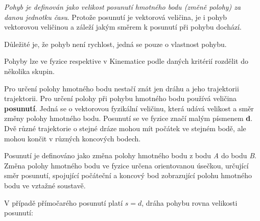 {\it Pohyb je definován jako velikost posunutí hmotného bodu (změně polohy) za danou jednotku času}. Protože posunutí je vektorová veličina, je i pohyb vektorovou veličinou a záleží jakým směrem k posunutí při pohybu dochází.

Důležité je, že pohyb není rychlost, jedná se pouze o vlastnost pohybu. 


Pohyby lze ve fyzice respektive v Kinematice podle daných kritérií rozdělit do několika skupin.
\vskip 4mm
\vskip 4mm

\vskip 4mm

\vskip 4mm


Pro určení polohy hmotného bodu nestačí znát jen dráhu a jeho trajektorii trajektorii. Pro určení polohy při pohybu hmotného bodu používá veličina {\bf posunutí}. Jedná se o vektorovou fyzikální veličinu, která udává velikost a směr změny polohy hmotného bodu. Posunutí se ve fyzice značí malým písmenem {\bf d}. Dvě různé trajektorie o stejné dráze mohou mít počátek ve stejném bodě, ale mohou končit v různých koncových bodech. 

\centerline{}

Posunutí je definováno jako změna polohy hmotného bodu z bodu {\it A} do bodu {\it B}. Změna polohy hmotného bodu ve fyzice určena orientovanou úsečkou, určující směr posunutí, spojující počáteční a koncový bod zobrazující polohu hmotného bodu ve vztažné soustavě. 

V případě přímočarého posunutí platí $ s = d $, dráha pohybu rovna velikosti posunutí:

